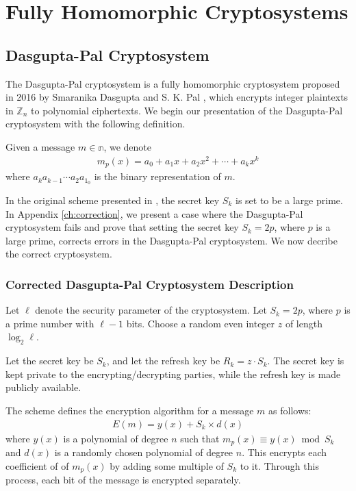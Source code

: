 \section{Fully Homomorphic Cryptosystems}
\subsection{Dasgupta-Pal Cryptosystem}
The Dasgupta-Pal cryptosystem is a fully homomorphic cryptosystem proposed in 2016 by Smaranika Dasgupta and S. K. Pal \cite{dasgupta_design_2016}, which encrypts integer plaintexts in $\mathbb{Z}_n$ to polynomial ciphertexts. We begin our presentation of the Dasgupta-Pal cryptosystem with the following definition.

Given a message $m \in \mathbb{n}$, we denote
\begin{align*}
		m_p(x) = a_0 + a_1x + a_2x^2 + \cdots + a_kx^k
\end{align*}
where $a_ka_{k-1}\cdots a_2a_1_0$ is the binary representation of $m$.

In the original scheme presented in \cite{dasgupta_design_2016}, the secret key $S_k$ is set to be a large prime. In Appendix \autoref{ch:correction}, we present a case where the Dasgupta-Pal cryptosystem fails and prove that setting the secret key $S_k = 2p$, where $p$ is a large prime, corrects errors in the Dasgupta-Pal cryptosystem.
We now decribe the correct cryptosystem.
\subsubsection{Corrected Dasgupta-Pal Cryptosystem Description}
Let $\ell$ denote the security parameter of the cryptosystem.
Let $S_k = 2p$, where $p$ is a prime number with $\ell - 1$ bits.
Choose a random even integer $z$ of length $\log_2{\ell}$.

Let the secret key be $S_k$, and let the refresh key be $R_k = z \cdot S_k$. The secret key is kept private to the encrypting/decrypting parties, while the refresh key is made publicly available.

The scheme defines the encryption algorithm for a message $m$ as follows:
\begin{align*}
	E(m) = y(x) + S_k\times d(x)
\end{align*}
where
$y(x)$ is a polynomial of degree $n$ such that $m_p(x) \equiv y(x) \bmod S_k$ and $d(x)$ is a randomly chosen polynomial of degree $n$. This encrypts each coefficient of of $m_p(x)$ by adding some multiple of $S_k$ to it. Through this process, each bit of the message is encrypted separately.

